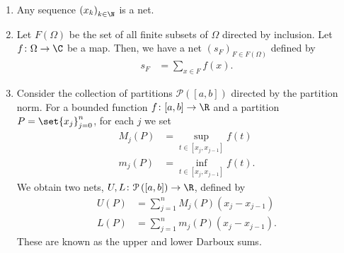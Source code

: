 \begin{example}\hfill
\begin{enumerate}[(1)]
  \item Any sequence $\left(x_k\right)_{k\in \N}$ is a net.
  \item Let $F\left(\Omega\right)$ be the set of all finite subsets of $\Omega$ directed by inclusion. Let $f\colon \Omega\rightarrow \C$ be a map. Then, we have a net $\left(s_F\right)_{F\in F\left(\Omega\right)}$ defined by
    \begin{align*}
      s_F &= \sum_{x\in F}f\left(x\right).
    \end{align*}
  \item Consider the collection of partitions $\mathcal{P}\left([a,b]\right)$ directed by the partition norm. For a bounded function $f\colon [a,b]\rightarrow \R$ and a partition $P = \set{x_j}_{j=0}^{n}$, for each $j$ we set
    \begin{align*}
      M_j\left(P\right) &= \sup_{t\in \left[x_j,x_{j-1}\right]}f(t)\\
      m_j\left(P\right) &= \inf_{t\in \left[x_j,x_{j-1}\right]}f(t).
    \end{align*}
    We obtain two nets, $U,L\colon \mathcal{P}\left([a,b]\right)\rightarrow \R$, defined by
    \begin{align*}
      U\left(P\right) &= \sum_{j=1}^{n}M_j\left(P\right)\left(x_j - x_{j-1}\right)\\
      L\left(P\right) &= \sum_{j=1}^{n}m_j\left(P\right)\left(x_j-x_{j-1}\right).
    \end{align*}
    These are known as the upper and lower Darboux sums.
\end{enumerate}
\end{example}
